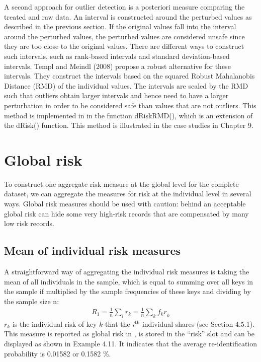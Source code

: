 \documentclass[letterpaper,10pt,english]{sphinxmanual}
\begin{document}
A second approach for outlier detection is a posteriori measure
comparing the treated and raw data. An interval is constructed around
the perturbed values as described in the previous section. If the
original values fall into the interval around the perturbed values, the
perturbed values are considered unsafe since they are too close to the
original values. There are different ways to construct such intervals,
such as rank-based intervals and standard deviation-based intervals.
Templ and Meindl (2008) propose a robust alternative for these
intervals. They construct the intervals based on the squared Robust
Mahalanobis Distance (RMD) of the individual values. The intervals are
scaled by the RMD such that outliers obtain larger intervals and hence
need to have a larger perturbation in order to be considered safe than
values that are not outliers. This method is implemented in 
in the function dRiskRMD(), which is an extension of the dRisk()
function. This method is illustrated in the case studies in Chapter 9.


\section{Global risk}
\label{\detokenize{measure_risk:global-risk}}
To construct one aggregate risk measure at the global level for the
complete dataset, we can aggregate the measures for risk at the
individual level in several ways. Global risk measures should be used
with caution: behind an acceptable global risk can hide some very
high-risk records that are compensated by many low risk records.


\subsection{Mean of individual risk measures}
\label{\detokenize{measure_risk:mean-of-individual-risk-measures}}
A straightforward way of aggregating the individual risk measures is
taking the mean of all individuals in the sample, which is equal to
summing over all keys in the sample if multiplied by the sample
frequencies of these keys and dividing by the sample size n:
\begin{equation*}
\begin{split}R_{1} = \frac{1}{n}\sum_{i}^{}r_{k} = \frac{1}{n}\sum_{k}^{}{f_{k}r}_{k}\end{split}
\end{equation*}
\(r_{k}\) is the individual risk of key \(k\) that the
\(i\)$^{\text{th}}$ individual shares (see Section 4.5.1). This measure
is reported as global risk in , is stored in the “risk” slot
and can be displayed as shown in Example 4.11. It indicates that the
average re-identification probability is 0.01582 or 0.1582 \%.
\end{document}
